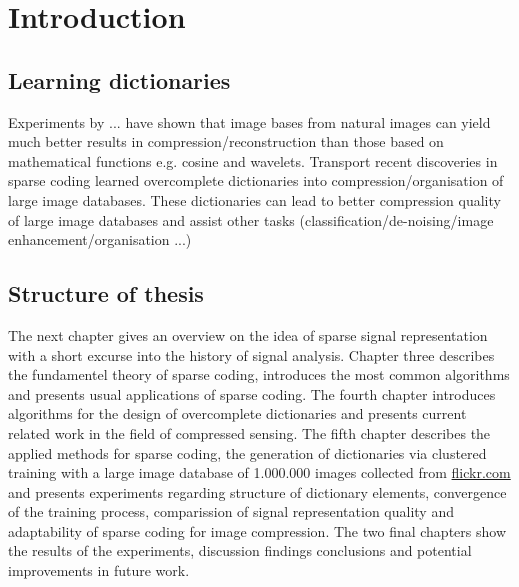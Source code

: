 \chapter{Introduction}
\label{sec:introduction}
\section{Learning dictionaries} %



Experiments by ... have shown that image bases from natural
images can yield much better results in compression/reconstruction than
those based on mathematical functions e.g. cosine and
wavelets.\cite{Elad2006,Mairal2010}
Transport recent discoveries in sparse coding learned overcomplete
dictionaries into compression/organisation of large image databases.
These dictionaries can lead to better compression quality of large
image databases and assist other tasks (classification/de-noising/image
enhancement/organisation ...)


\section{Structure of thesis}
The next chapter gives an overview on the idea of sparse signal
representation with a short excurse into the history of signal analysis. Chapter
three describes the fundamentel theory of sparse coding, introduces the most
common algorithms and presents usual applications of sparse coding. The fourth
chapter introduces algorithms for the design of overcomplete dictionaries and
presents current related work in the field of compressed sensing. The fifth
chapter describes the applied methods for sparse coding, the generation of
dictionaries via clustered training with a large image database of 1.000.000
images collected from \url{flickr.com} and presents experiments regarding
structure of dictionary elements, convergence of the training process,
comparission of signal representation quality and adaptability of sparse coding
for image compression. The two final chapters show the results of the
experiments, discussion findings conclusions and potential improvements in
future work. 

